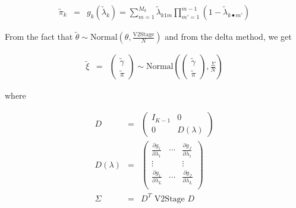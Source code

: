 \documentclass[11pt]{article}
\begin{document}
\begin{eqnarray}
\tilde{\pi}_k & = & g_k(\tilde{\lambda}_k)
               = \sum_{m=1}^{M_k}
               \tilde{\lambda}_{k1m}\prod_{m'=1}^{m-1}(1-\tilde{\lambda}_{k \bullet m'})\label{eqnPi}
\end{eqnarray}

From the fact that $\tilde{\theta} \sim \mbox{Normal}(\theta,
\frac{\mbox{V2Stage}}{N})$
and from the delta method, we get

\begin{eqnarray}
\tilde{\xi} & =  & 
             \begin{pmatrix}  \tilde{\gamma}\\
                   \tilde{\pi}  
              \end{pmatrix} \sim \mbox{Normal}(
               \begin{pmatrix}  \tilde{\gamma}\\  \tilde{\pi}  \end{pmatrix},
 \frac{\Sigma} {N} ) \label{eq:xiTilde}
\end{eqnarray}

where 

\begin{eqnarray}
D & = & \left( 
               \begin{array}{cc}
                    I_{K-1} & 0 \\
                    0 & D(\lambda)
                \end{array} 
               \right) \\
D(\lambda) & = & \left( 
                \begin{array} {lll}
                    \frac{\partial g_1}{\partial \lambda_1} & \cdots & 
                           \frac{\partial g_J}{\partial \lambda_1} \\
                     \vdots & & \vdots\\
                     \frac{\partial g_1}{\partial \lambda_L}
                          & \cdots & 
                          \frac{\partial g_J}{\partial
                          \lambda_L} \\
                    \end{array}
                    \right) 
                    \label{eqnDeltaDetails}  \\
\Sigma & = & D^T \mbox{ V2Stage } D
\end{eqnarray}

\end{document}
